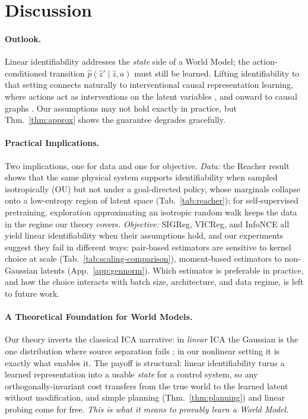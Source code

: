 \documentclass{article}
\begin{document}
 

\section{Discussion}\label{sec:discussion}

\paragraph{Outlook.}
Linear identifiability addresses the \emph{state} side of a World Model; the action-conditioned transition $\hat p(\hat z' \mid \hat z, a)$ must still be learned. Lifting identifiability to that setting connects naturally to interventional causal representation learning, where actions act as interventions on the latent variables \citep{ahuja2023, buchholz2024}, and onward to causal graphs \citep{nam2026causal}. Our assumptions may not hold exactly in practice, but Thm.~\ref{thm:approx} shows the guarantee degrades gracefully.

\paragraph{Practical Implications.}
Two implications, one for data and one for objective. \textit{Data:} the Reacher result shows that the same physical system supports identifiability when sampled isotropically (OU) but not under a goal-directed policy, whose marginals collapse onto a low-entropy region of latent space (Tab.~\ref{tab:reacher}); for self-supervised pretraining, exploration approximating an isotropic random walk keeps the data in the regime our theory covers. \textit{Objective:} SIGReg, VICReg, and InfoNCE all yield linear identifiability when their assumptions hold, and our experiments suggest they fail in different ways: pair-based estimators are sensitive to kernel choice at scale (Tab.~\ref{tab:scaling-comparison}), moment-based estimators to non-Gaussian latents (App.~\ref{app:gennorm}). Which estimator is preferable in practice, and how the choice interacts with batch size, architecture, and data regime, is left to future work.

\paragraph{A Theoretical Foundation for World Models.}
Our theory inverts the classical ICA narrative: in \emph{linear} ICA the Gaussian is the one distribution where source separation fails \citep{comon1994}; in our nonlinear setting it is exactly what enables it. The payoff is structural: linear identifiability turns a learned representation into a usable \emph{state} for a control system, so any orthogonally-invariant cost transfers from the true world to the learned latent without modification, and simple planning (Thm.~\ref{thm:planning}) and linear probing come for free. \textit{This is what it means to provably learn a World Model.}
\end{document}
